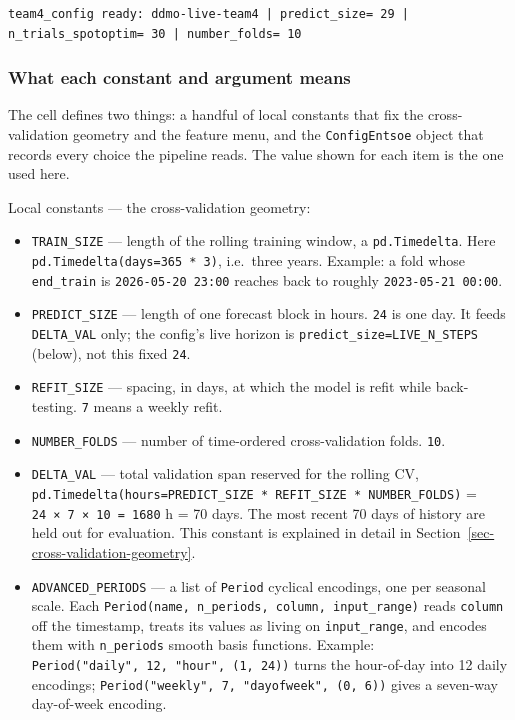 \documentclass[
  english,
  letterpaper,
]{scrbook}
\providecommand{\tightlist}{%
  \setlength{\itemsep}{0pt}\setlength{\parskip}{0pt}}
\begin{document}
\begin{verbatim}
team4_config ready: ddmo-live-team4 | predict_size= 29 | n_trials_spotoptim= 30 | number_folds= 10
\end{verbatim}

\subsubsection{What each constant and argument
means}\label{what-each-constant-and-argument-means}

The cell defines two things: a handful of local constants that fix the
cross-validation geometry and the feature menu, and the
\texttt{ConfigEntsoe} object that records every choice the pipeline
reads. The value shown for each item is the one used here.

Local constants --- the cross-validation geometry:

\begin{itemize}
\tightlist
\item
  \texttt{TRAIN\_SIZE} --- length of the rolling training window, a
  \texttt{pd.Timedelta}. Here \texttt{pd.Timedelta(days=365\ *\ 3)},
  i.e.~three years. Example: a fold whose \texttt{end\_train} is
  \texttt{2026-05-20\ 23:00} reaches back to roughly
  \texttt{2023-05-21\ 00:00}.
\item
  \texttt{PREDICT\_SIZE} --- length of one forecast block in hours.
  \texttt{24} is one day. It feeds \texttt{DELTA\_VAL} only; the
  config's live horizon is \texttt{predict\_size=LIVE\_N\_STEPS}
  (below), not this fixed \texttt{24}.
\item
  \texttt{REFIT\_SIZE} --- spacing, in days, at which the model is refit
  while back-testing. \texttt{7} means a weekly refit.
\item
  \texttt{NUMBER\_FOLDS} --- number of time-ordered cross-validation
  folds. \texttt{10}.
\item
  \texttt{DELTA\_VAL} --- total validation span reserved for the rolling
  CV,
  \texttt{pd.Timedelta(hours=PREDICT\_SIZE\ *\ REFIT\_SIZE\ *\ NUMBER\_FOLDS)}
  = \texttt{24\ ×\ 7\ ×\ 10\ =\ 1680} h = 70 days. The most recent 70
  days of history are held out for evaluation. This constant is
  explained in detail in Section~\ref{sec-cross-validation-geometry}.
\item
  \texttt{ADVANCED\_PERIODS} --- a list of \texttt{Period} cyclical
  encodings, one per seasonal scale. Each
  \texttt{Period(name,\ n\_periods,\ column,\ input\_range)} reads
  \texttt{column} off the timestamp, treats its values as living on
  \texttt{input\_range}, and encodes them with \texttt{n\_periods}
  smooth basis functions. Example:
  \texttt{Period("daily",\ 12,\ "hour",\ (1,\ 24))} turns the
  hour-of-day into 12 daily encodings;
  \texttt{Period("weekly",\ 7,\ "dayofweek",\ (0,\ 6))} gives a
  seven-way day-of-week encoding.
\end{itemize}
\end{document}
